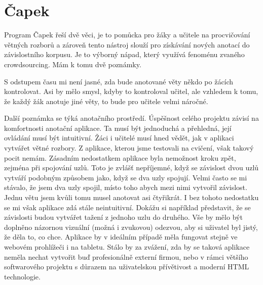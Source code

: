 \documentclass[12pt,a4paper]{report}
\begin{document}
\section*{Čapek}

Program Čapek řeší dvě věci, je to pomůcka pro žáky a učitele na procvičování
větných rozborů a zároveň tento nástroj slouží pro získávání nových anotací do
závislostního korpusu. Je to výborný nápad, který využívá fenoménu zvaného
crowdsourcing. Mám k tomu dvě poznámky.

S odstupem času mi není jasné, zda bude anotované věty někdo po žácích
kontrolovat. Asi by mělo smysl, kdyby to kontroloval učitel, ale vzhledem k
tomu, že každý žák anotuje jiné věty, to bude pro učitele velmi náročné. 

Další poznámka se týká anotačního prostředí. Úspěšnost celého projektu závisí
na komfortnosti anotační aplikace.  Ta musí být jednoduchá a přehledná, její
ovládání musí být intuitivní. Žáci i učitelé musí hned vědět, jak v aplikaci
vytvářet větné rozbory. Z aplikace, kterou jsme testovali na cvičení, však
takový pocit nemám. Zásadním nedostatkem aplikace byla nemožnost kroku zpět,
zejména při spojování uzlů. Toto je zvlášť nepříjemné, když se závislost dvou
uzlů vytváří podobným způsobem jako, když se dva uzly spojují. Velmi často se
mi stávalo, že jsem dva uzly spojil, místo toho abych mezi nimi vytvořil
závislost. Jednu větu jsem kvůli tomu musel anotovat asi čtyřikrát. I bez
tohoto nedostatku se mi však aplikace zdá stále neintuitivní. Dokážu si
například představit, že se závislosti budou vytvářet tažení z jednoho uzlu do
druhého. Vše by mělo být doplněno názornou vizuální (možná i zvukovou) odezvou,
aby si uživatel byl jistý, že děla to, co chce. Aplikace by v ideálním případě
měla fungovat stejně ve webovém prohlížeči i na tabletu. Stálo by za zvážení,
zda by se taková aplikace neměla nechat vytvořit buď profesionálně externí
firmou, nebo v rámci většího softwarového projektu s důrazem na uživatelskou
přívětivost a moderní HTML technologie. 
\end{document}
